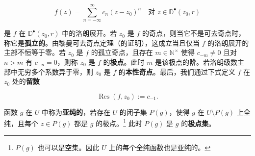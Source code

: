 \[
f(z) = \sum_{n=-\infty}^{\infty}c_{n}(z - z_{0})^{n} \quad \text{对 } z \in \mathbb{D}^{\bullet}(z_{0},r)
\]

是 $ f $ 在 $ \mathbb{D}^{\bullet}(z_{0},r) $ 中的洛朗展开。若 $ z_{0} $ 是 $ f $ 的奇点，则当它不是可去奇点时，称它是\textbf{孤立的}。由黎曼可去奇点定理（的证明），这成立当且仅当 $ f $ 的洛朗展开的主部不恒等于零。若 $ z_{0} $ 是 $ f $ 的孤立奇点，且存在 $ m \in \mathbb{N}^{\times} $ 使得 $ c_{-m} \ne 0 $ 且对 $ n > m $ 有 $ c_{-n} = 0 $，则称 $ z_{0} $ 是 $ f $ 的\textbf{极点}。此时 $ m $ 是该极点的\textbf{阶}。若洛朗级数主部中无穷多个系数异于零，则 $ z_{0} $ 是 $ f $ 的\textbf{本性奇点}。最后，我们通过下式定义 $ f $ 在 $ z_{0} $ 处的\textbf{留数}

\[
\operatorname{Res}(f,z_{0}) := c_{-1} .
\]

函数 $ g $ 在 $ U $ 中称为\textbf{亚纯的}，若存在 $ U $ 的闭子集 $ P(g) $，使得 $ g $ 在 $ U\setminus P(g) $ 上全纯，且每个 $ z \in P(g) $ 都是 $ g $ 的极点。\footnote{$ P(g) $ 也可以是空集。因此 $ U $ 上的每个全纯函数也是亚纯的。} 此时 $ P(g) $ 是 $ g $ 的\textbf{极点集}。

